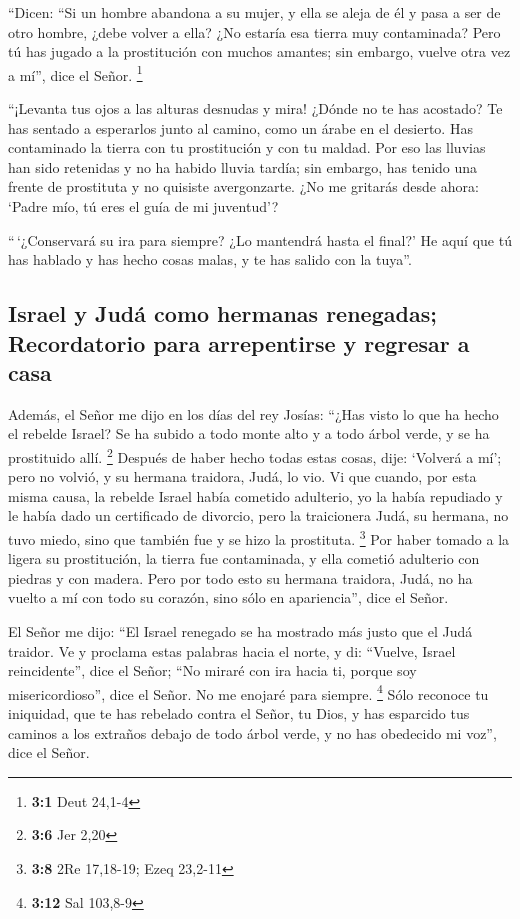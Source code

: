  ``Dicen: ``Si un hombre abandona a su mujer, y ella se
aleja de él y pasa a ser de otro hombre, ¿debe volver a ella? ¿No
estaría esa tierra muy contaminada? Pero tú has jugado a la prostitución
con muchos amantes; sin embargo, vuelve otra vez a mí'', dice el Señor.
\footnote{\textbf{3:1} Deut 24,1-4}

 ``¡Levanta tus ojos a las alturas desnudas y mira! ¿Dónde
no te has acostado? Te has sentado a esperarlos junto al camino, como un
árabe en el desierto. Has contaminado la tierra con tu prostitución y
con tu maldad.  Por eso las lluvias han sido retenidas y
no ha habido lluvia tardía; sin embargo, has tenido una frente de
prostituta y no quisiste avergonzarte.  ¿No me gritarás
desde ahora: `Padre mío, tú eres el guía de mi juventud'?

 ``\,`¿Conservará su ira para siempre? ¿Lo mantendrá hasta
el final?' He aquí que tú has hablado y has hecho cosas malas, y te has
salido con la tuya''.

\hypertarget{israel-y-juduxe1-como-hermanas-renegadas-recordatorio-para-arrepentirse-y-regresar-a-casa}{%
\subsection{Israel y Judá como hermanas renegadas; Recordatorio para
arrepentirse y regresar a
casa}\label{israel-y-juduxe1-como-hermanas-renegadas-recordatorio-para-arrepentirse-y-regresar-a-casa}}

 Además, el Señor me dijo en los días del rey Josías:
``¿Has visto lo que ha hecho el rebelde Israel? Se ha subido a todo
monte alto y a todo árbol verde, y se ha prostituido allí. \footnote{\textbf{3:6}
  Jer 2,20}  Después de haber hecho todas estas cosas,
dije: `Volverá a mí'; pero no volvió, y su hermana traidora, Judá, lo
vio.  Vi que cuando, por esta misma causa, la rebelde
Israel había cometido adulterio, yo la había repudiado y le había dado
un certificado de divorcio, pero la traicionera Judá, su hermana, no
tuvo miedo, sino que también fue y se hizo la prostituta. \footnote{\textbf{3:8}
  2Re 17,18-19; Ezeq 23,2-11}  Por haber tomado a la
ligera su prostitución, la tierra fue contaminada, y ella cometió
adulterio con piedras y con madera.  Pero por todo esto
su hermana traidora, Judá, no ha vuelto a mí con todo su corazón, sino
sólo en apariencia'', dice el Señor.

 El Señor me dijo: ``El Israel renegado se ha mostrado
más justo que el Judá traidor.  Ve y proclama estas
palabras hacia el norte, y di: ``Vuelve, Israel reincidente'', dice el
Señor; ``No miraré con ira hacia ti, porque soy misericordioso'', dice
el Señor. No me enojaré para siempre. \footnote{\textbf{3:12} Sal
  103,8-9}  Sólo reconoce tu iniquidad, que te has
rebelado contra el Señor, tu Dios, y has esparcido tus caminos a los
extraños debajo de todo árbol verde, y no has obedecido mi voz'', dice
el Señor.

